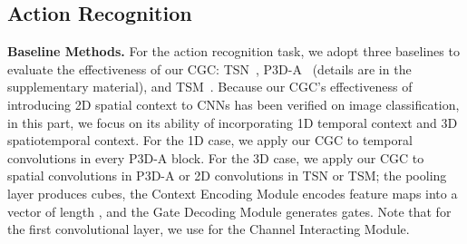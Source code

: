 \documentclass[runningheads]{llncs}
\begin{document}
\subsection{Action Recognition}
\label{sec:act}
\textbf{Baseline Methods.} For the action recognition task, we adopt three baselines to evaluate the effectiveness of our CGC: TSN~\cite{TSN}, P3D-A~\cite{qiu2017learning} (details are in the supplementary material), and TSM~\cite{lin2018temporal}. Because our CGC's effectiveness of introducing 2D spatial context to CNNs has been verified on image classification, in this part, we focus on its ability of incorporating 1D temporal context and 3D spatiotemporal context. For the 1D case, we apply our CGC to temporal convolutions in every P3D-A block. For the 3D case, we apply our CGC to spatial convolutions in P3D-A or 2D convolutions in TSN or TSM; the pooling layer produces  cubes, the Context Encoding Module encodes  feature maps into a vector of length , and the Gate Decoding Module generates  gates. Note that for the first convolutional layer, we use  for the Channel Interacting Module.
\end{document}
